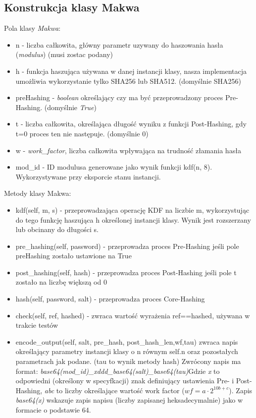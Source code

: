 \documentclass[a4paper,titleauthor]{mwart}
\begin{document}
\subsection{Konstrukcja klasy Makwa}
Pola klasy \textit{Makwa}:
\begin{itemize}
	\item n - liczba całkowita, główny parametr uzywany do haszowania hasła (\textit{modulus}) (musi zostac podany)
	\item h - funkcja haszująca używana w danej instancji klasy, nasza implementacja umożliwia wykorzystanie tylko SHA256 lub SHA512. (domyślnie SHA256)
	\item preHashing - \textit{boolean} określający czy ma być przeprowadzony proces Pre-Hashing. (domyślnie \textit{True})
	\item t - liczba całkowita, określająca długość wyniku z funkcji Post-Hashing, gdy t=0 proces ten nie następuje. (domyślnie 0)
	\item w - \textit{work\_factor}, liczba całkowita wpływająca na trudność złamania hasła
	\item mod\_id - ID modulusa generowane jako wynik funkcji kdf(n, 8). Wykorzystywane przy eksporcie stanu instancji.
\end{itemize}
Metody klasy Makwa:
\begin{itemize}
	\item kdf(self, m, s) - przeprowadzająca operację KDF na liczbie m, wykorzystując do tego funkcję haszująca h określonej instancji klasy. Wynik jest rozszerzany lub obcinany do długości s.
	\item pre\_hashing(self, password) - przeprowadza proces Pre-Hashing jeśli pole preHashing zostało ustawione na True
	\item post\_hashing(self, hash) - przeprowadza proces Post-Hashing jeśli pole t zostało na liczbę większą od 0
	\item hash(self, password, salt) - przeprowadza proces Core-Hashing
	\item check(self, ref, hashed) - zwraca wartość wyrażenia ref==hashed, używana w trakcie testów
	\item encode\_output(self, salt, pre\_hash, post\_hash\_len,wf,tau) zwraca napis określający parametry instancji klasy o n równym self.n oraz pozostałych parametrach jak podane. (tau to wynik metody hash)
	Zwrócony napis ma format: \textit{base64(mod\_id)\_xddd\_base64(salt)\_base64(tau)}Gdzie \textit{x} to odpowiedni (określony w specyfkacji) znak definiujący ustawienia Pre- i Post- Hashing, \textit{abc} to liczby określające wartość work factor ($wf=a\cdot 2^{10b + c}$). Zapis \textit{base64(x)} wskazuje zapis napisu (liczby zapisanej heksadecymalnie) jako w formacie o podstawie 64.
\end{itemize}
\end{document}
